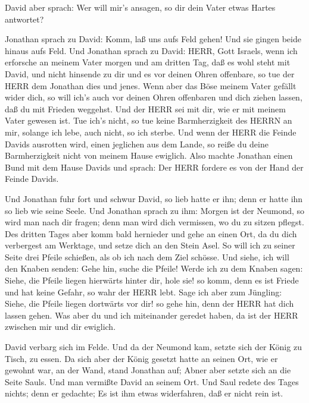  David aber sprach: Wer will mir's ansagen, so dir dein
Vater etwas Hartes antwortet?

 Jonathan sprach zu David: Komm, laß uns aufs Feld gehen!
Und sie gingen beide hinaus aufs Feld.  Und Jonathan sprach
zu David: HERR, Gott Israels, wenn ich erforsche an meinem Vater morgen
und am dritten Tag, daß es wohl steht mit David, und nicht hinsende zu
dir und es vor deinen Ohren offenbare,  so tue der HERR dem
Jonathan dies und jenes. Wenn aber das Böse meinem Vater gefällt wider
dich, so will ich's auch vor deinen Ohren offenbaren und dich ziehen
lassen, daß du mit Frieden weggehst. Und der HERR sei mit dir, wie er
mit meinem Vater gewesen ist.  Tue ich's nicht, so tue
keine Barmherzigkeit des HERRN an mir, solange ich lebe, auch nicht, so
ich sterbe.  Und wenn der HERR die Feinde Davids ausrotten
wird, einen jeglichen aus dem Lande, so reiße du deine Barmherzigkeit
nicht von meinem Hause ewiglich.  Also machte Jonathan
einen Bund mit dem Hause Davids und sprach: Der HERR fordere es von der
Hand der Feinde Davids.

 Und Jonathan fuhr fort und schwur David, so lieb hatte er
ihn; denn er hatte ihn so lieb wie seine Seele.  Und
Jonathan sprach zu ihm: Morgen ist der Neumond, so wird man nach dir
fragen; denn man wird dich vermissen, wo du zu sitzen pflegst.
 Des dritten Tages aber komm bald hernieder und gehe an
einen Ort, da du dich verbergest am Werktage, und setze dich an den
Stein Asel.  So will ich zu seiner Seite drei Pfeile
schießen, als ob ich nach dem Ziel schösse.  Und siehe, ich
will den Knaben senden: Gehe hin, suche die Pfeile! Werde ich zu dem
Knaben sagen: Siehe, die Pfeile liegen hierwärts hinter dir, hole sie!
so komm, denn es ist Friede und hat keine Gefahr, so wahr der HERR lebt.
 Sage ich aber zum Jüngling: Siehe, die Pfeile liegen
dortwärts vor dir! so gehe hin, denn der HERR hat dich lassen gehen.
 Was aber du und ich miteinander geredet haben, da ist der
HERR zwischen mir und dir ewiglich.

 David verbarg sich im Felde. Und da der Neumond kam,
setzte sich der König zu Tisch, zu essen.  Da sich aber der
König gesetzt hatte an seinen Ort, wie er gewohnt war, an der Wand,
stand Jonathan auf; Abner aber setzte sich an die Seite Sauls. Und man
vermißte David an seinem Ort.  Und Saul redete des Tages
nichts; denn er gedachte; Es ist ihm etwas widerfahren, daß er nicht
rein ist.

